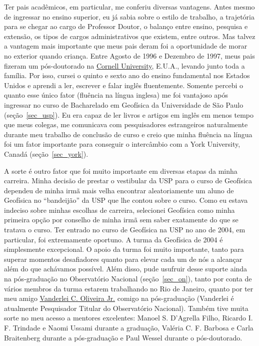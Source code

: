 \documentclass[12pt,a4paper,oneside]{book}
\newcommand{\ON}{Observatório Nacional}
\begin{document}
Ter pais acadêmicos, em particular, me conferiu diversas vantagens.
Antes mesmo de ingressar no ensino superior, eu já sabia sobre o estilo de
trabalho, a trajetória para se chegar ao cargo de Professor Doutor, o balanço
entre ensino, pesquisa e extensão, os tipos de cargos administrativos que
existem, entre outros.
Mas talvez a vantagem mais importante que meus pais deram foi a oportunidade
de morar no exterior quando criança.
Entre Agosto de 1996 e Dezembro de 1997, meus pais fizeram um pós-doutorado
na \href{https://www.cornell.edu/}{Cornell University}, E.U.A., levando junto
toda a família.
Por isso, cursei o quinto e sexto ano do ensino fundamental nos Estados Unidos
e aprendi a ler, escrever e falar inglês fluentemente.
Somente percebi o quanto esse único fator (fluência na língua inglesa) me foi
vantajoso após ingressar no curso de Bacharelado em Geofísica da Universidade
de São Paulo (seção~\ref{sec_usp}).
Eu era capaz de ler livros e artigos em inglês em menos tempo que meus colegas,
me comunicava com pesquisadores estrangeiros naturalmente durante meu trabalho
de conclusão de curso e creio que minha fluência na língua foi um fator
importante para conseguir o intercâmbio com a York University, Canadá
(seção~\ref{sec_york}).

A sorte é outro fator que foi muito importante em diversas etapas da minha
carreira.
Minha decisão de prestar o vestibular da USP para o curso de Geofísica dependeu
de minha irmã mais velha encontrar aleatoriamente um aluno de Geofísica no
``bandeijão'' da USP que lhe contou sobre o curso.
Como eu estava indeciso sobre minhas escolhas de carreira, selecionei Geofísica
como minha primeira opção por conselho de minha irmã sem saber exatamente do
que se tratava o curso.
Ter entrado no curso de Geofísica na USP no ano de 2004, em particular, foi
extremamente oportuno.
A turma da Geofísica de 2004 é simplesmente excepcional.
O apoio da turma foi muito importante, tanto para superar momentos desafiadores
quanto para elevar cada um de nós a alcançar além do que achávamos possível.
Além disso, pude usufruir desse suporte ainda na pós-graduação no \ON{} (seção~\ref{sec_on}), tanto por conta de vários membros da turma
estarem trabalhando no Rio de Janeiro, quanto por ter meu amigo
\href{https://www.pinga-lab.org/people/oliveira-jr.html}{Vanderlei C. Oliveira Jr.}
comigo na pós-graduação (Vanderlei é atualmente Pesquisador Titular do
\ON{}).
Também tive muita sorte no meu acesso a mentores excelentes:
Manoel S. D'Agrella Filho, Ricardo I. F. Trindade e Naomi Ussami
durante a graduação, Valéria C. F. Barbosa e Carla Braitenberg durante a
pós-graduação e Paul Wessel durante o pós-doutorado.
\end{document}
